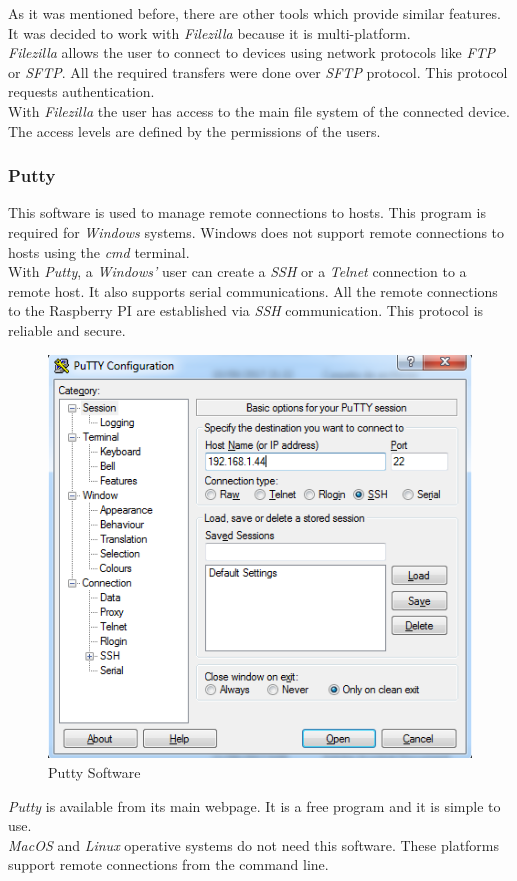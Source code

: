 As it was mentioned before, there are other tools which provide similar features. It was decided to work with \textit{Filezilla} because it is multi-platform.\\

\textit{Filezilla} allows the user to connect to devices using network protocols like \textit{FTP} or \textit{SFTP}. All the required transfers were done over \textit{SFTP} protocol. This protocol requests authentication.\\

With \textit{Filezilla} the user has access to the main file system of the connected device. The access levels are defined by the permissions of the users.

\subsubsection{Putty}

This software is used to manage remote connections to hosts. This program is required for \textit{Windows} systems. Windows does not support remote connections to hosts using the \textit{cmd} terminal.\\

With \textit{Putty}, a \textit{Windows'} user can create a \textit{SSH} or a \textit{Telnet} connection to a remote host. It also supports serial communications. All the remote connections to the Raspberry PI are established via \textit{SSH} communication. This protocol is reliable and secure.\\

\begin{figure}[H]
\begin{centering}
\includegraphics[scale=0.7]{IMGS/PUTTY.PNG}
\caption{Putty Software \label{PYCHARM}}
\end{centering}
\end{figure}

\textit{Putty} is available from its main webpage. It is a free program and it is simple to use.\\

\textit{MacOS} and \textit{Linux} operative systems do not need this software. These platforms support remote connections from the command line.

\newpage

